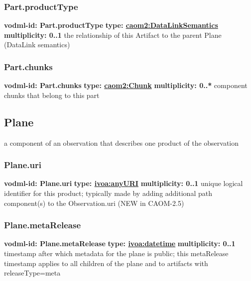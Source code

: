     \subsubsection{Part.productType}
      \textbf{vodml-id: Part.productType} \newline
      \textbf{type: \hyperref[sect:DataLinkSemantics]{caom2:DataLinkSemantics}} \newline
      \textbf{multiplicity: 0..1} \newline
      the relationship of this Artifact to the parent Plane (DataLink semantics)

    \subsubsection{Part.chunks}
      \textbf{vodml-id: Part.chunks} \newline
      \textbf{type: \hyperref[sect:Chunk]{caom2:Chunk}} \newline
      \textbf{multiplicity: 0..*} \newline
      component chunks that belong to this part

  \subsection{Plane}
  \label{sect:Plane}
    a component of an observation that describes one product of the observation

    \subsubsection{Plane.uri}
      \textbf{vodml-id: Plane.uri} \newline
      \textbf{type: \hyperref[sect:ivoa]{ivoa:anyURI}} \newline
      \textbf{multiplicity: 0..1} \newline
      unique logical identifier for this product; typically made by adding additional path component(s) to the Observation.uri (NEW in CAOM-2.5)

    \subsubsection{Plane.metaRelease}
      \textbf{vodml-id: Plane.metaRelease} \newline
      \textbf{type: \hyperref[sect:ivoa]{ivoa:datetime}} \newline
      \textbf{multiplicity: 0..1} \newline
      timestamp after which metadata for the plane is public; this metaRelease timestamp applies to all children of the plane and to artifacts with releaseType=meta

